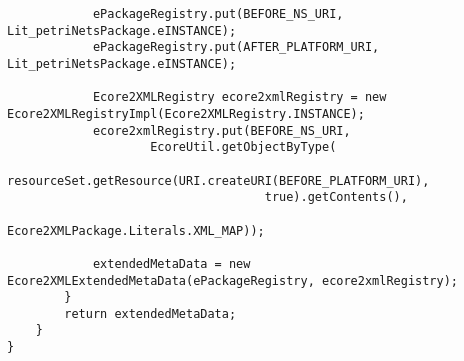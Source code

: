 \begin{lstlisting}
			ePackageRegistry.put(BEFORE_NS_URI,      Lit_petriNetsPackage.eINSTANCE);
			ePackageRegistry.put(AFTER_PLATFORM_URI, Lit_petriNetsPackage.eINSTANCE);
			
			Ecore2XMLRegistry ecore2xmlRegistry = new Ecore2XMLRegistryImpl(Ecore2XMLRegistry.INSTANCE);
			ecore2xmlRegistry.put(BEFORE_NS_URI,
					EcoreUtil.getObjectByType(
							resourceSet.getResource(URI.createURI(BEFORE_PLATFORM_URI), 
									true).getContents(),
									Ecore2XMLPackage.Literals.XML_MAP));
			
			extendedMetaData = new Ecore2XMLExtendedMetaData(ePackageRegistry, ecore2xmlRegistry);			
		}
		return extendedMetaData;
	}
}

\end{lstlisting}